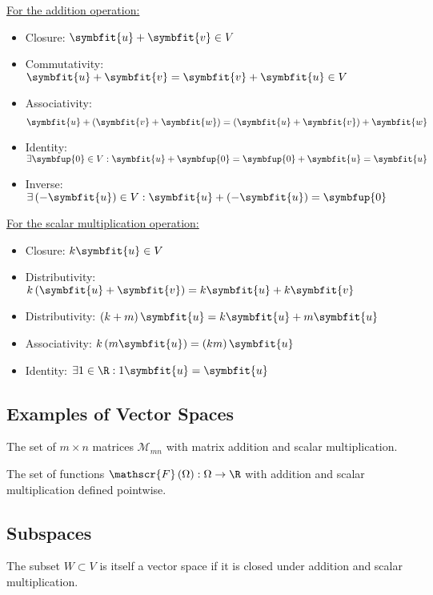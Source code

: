 \documentclass{article}
\begin{document}
\begin{multicols*}{3}
    \underline{For the addition operation:}
    \begin{itemize}[leftmargin=*,itemsep=-1ex,partopsep=1ex,parsep=1ex]
        \item Closure: \(\symbfit{u} + \symbfit{v} \in V\)
        \item Commutativity: \(\symbfit{u} + \symbfit{v} = \symbfit{v} + \symbfit{u} \in V\)
        \item Associativity: \begin{equation*}\symbfit{u} + \left( \symbfit{v} + \symbfit{w} \right) = \left( \symbfit{u} + \symbfit{v} \right) + \symbfit{w}\end{equation*}
        \item Identity: \(\exists \symbfup{0} \in V : \symbfit{u} + \symbfup{0} = \symbfup{0} + \symbfit{u} = \symbfit{u}\)
        \item Inverse: \(\exists \left( -\symbfit{u} \right) \in V : \symbfit{u} + \left( -\symbfit{u} \right) = \symbfup{0}\)
    \end{itemize}
    \underline{For the scalar multiplication operation:}
    \begin{itemize}[leftmargin=*,itemsep=-1ex,partopsep=1ex,parsep=1ex]
        \item Closure: \(k \symbfit{u} \in V\)
        \item Distributivity: \(k \left( \symbfit{u} + \symbfit{v} \right) = k\symbfit{u} + k\symbfit{v}\)
        \item Distributivity: \(\left( k + m \right) \symbfit{u} = k\symbfit{u} + m\symbfit{u}\)
        \item Associativity: \(k \left( m\symbfit{u} \right) = \left( k m \right) \symbfit{u}\)
        \item Identity: \(\exists 1 \in \R : 1 \symbfit{u} = \symbfit{u}\)
    \end{itemize}

    \subsection{Examples of Vector Spaces}
    The set of \(m \times n\) matrices \(\mathscr{M}_{mn}\) with matrix addition and scalar multiplication.

    The set of functions \(\mathscr{F}\left( \Omega \right) : \Omega \to \R\) with addition and scalar multiplication defined pointwise.
    \subsection{Subspaces}
    The subset \(W \subset V\) is itself a vector space if it is closed under addition and scalar multiplication.

\end{multicols*}
\end{document}
